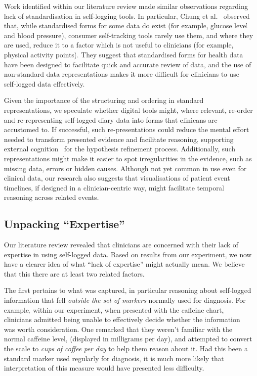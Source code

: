 \documentclass{sigchi}
\begin{document}
Work identified within our literature review made similar observations regarding lack of standardisation in self-logging tools. In particular, Chung et al.\ \cite{chung_more_2015} observed that, while standardised forms for some data do exist (for example, glucose level and blood pressure), consumer self-tracking tools rarely use them, and where they are used, reduce it to a factor which is not useful to clinicians (for example, physical activity points). They suggest that standardised forms for health data have been designed to facilitate quick and accurate review of data, and the use of non-standard data representations makes it more difficult for clinicians to use self-logged data effectively.

Given the importance of the structuring and ordering in standard representations, we speculate whether digital tools might, where relevant, re-order and re-representing self-logged diary data into forms that clinicans are accustomed to.  If successful, such re-presentations could reduce the mental effort needed to transform presented evidence and facilitate reasoning, supporting external cognition~\cite{extcog} for the hypothesis refinement process.  Additionally, such representations might make it easier to spot irregularities in the evidence, such as missing data, errors or hidden causes.  Although not yet common in use even for clinical data, our research also suggests that visualisations of patient event timelines, if designed in a clinician-centric way, might facilitate temporal reasoning across related events.





\subsection{Unpacking ``Expertise''}

Our literature review revealed that clinicians are concerned with their lack of expertise in using self-logged data. Based on results from our experiment, we now have a clearer idea of what ``lack of expertise'' might actually mean.  We believe that this there are at least two related factors.

The first pertains to what was captured, in particular reasoning about self-logged information that fell \emph{outside the set of markers} normally used for diagnosis.  For example, within our experiment, when presented with the caffeine chart, clinicians admitted being unable to effectively decide whether the information was worth consideration.  One remarked that they weren't familiar with the normal caffeine level, (displayed in milligrams per day), and attempted to convert the scale to \emph{cups of coffee per day} to help them reason about it.  Had this been a standard marker used regularly for diagnosis, it is much more likely that interpretation of this measure would have presented less difficulty.
\end{document}
